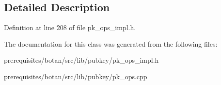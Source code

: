 \subsection{Detailed Description}


Definition at line 208 of file pk\+\_\+ops\+\_\+impl.\+h.



The documentation for this class was generated from the following files\+:\begin{DoxyCompactItemize}
\item 
prerequisites/botan/src/lib/pubkey/pk\+\_\+ops\+\_\+impl.\+h\item 
prerequisites/botan/src/lib/pubkey/pk\+\_\+ops.\+cpp\end{DoxyCompactItemize}

